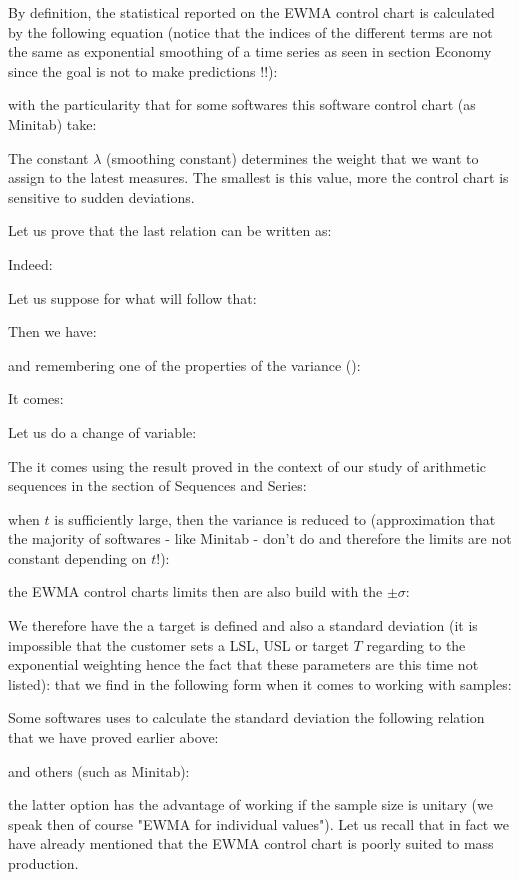 	By definition, the statistical reported on the EWMA control chart is calculated by the following equation (notice that the indices of the different terms are not the same as exponential smoothing of a time series as seen in section Economy since the goal is not to make predictions !!):
	
	
	with the particularity that for some softwares this software control chart (as Minitab) take:
	
	The constant $\lambda$ (smoothing constant) determines the weight that we want to assign to the latest measures. The smallest is this value, more the control chart is sensitive to sudden deviations.

	Let us prove that the last relation can be written as:
	
	Indeed:
	
	Let us suppose for what will follow that:
	
	Then we have:
	
	and remembering one of the properties of the variance ():
	
	It comes:
	
	Let us do a change of variable:
	
	The it comes using the result proved in the context of our study of arithmetic sequences in the section of Sequences and Series:
	
	when $t$ is sufficiently large, then the variance is reduced to (approximation that the majority of softwares - like Minitab - don't do and therefore the limits are not constant depending on $t$!):
	
	the EWMA control charts limits then are also build with the $\pm\sigma$:
	
	We therefore have the a target is defined and also a standard deviation (it is impossible that the customer sets  a LSL, USL or target $T$ regarding to the exponential weighting hence the fact that these parameters are this time not listed):
	that we find in the following form when it comes to working with samples:
	
	Some softwares uses to calculate the standard deviation the following relation that we have proved earlier above:
	
	and others (such as Minitab):
	
	the latter option has the advantage of working if the sample size is unitary (we speak then of course "EWMA for individual values"). Let us recall that in fact we have already mentioned that the EWMA control chart is poorly suited to mass production.
	
